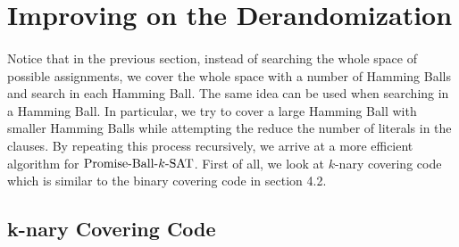 \documentclass[a4paper,12pts]{article}
\newcommand{\SAT}{\textnormal{$k$-SAT}}
\newcommand{\PBS}{\textnormal{Promise-Ball-$\SAT$}}
\begin{document}
\section{Improving on the Derandomization\cite{Moser11}}
\paragraph{} Notice that in the previous section, instead of searching the whole space of possible assignments, we cover the whole space with a number of Hamming Balls and search in each Hamming Ball. The same idea can be used when searching in a Hamming Ball. In particular, we try to cover a large Hamming Ball with smaller Hamming Balls while attempting the reduce the number of literals in the clauses. By repeating this process recursively, we arrive at a more efficient algorithm for $\PBS$. First of all, we look at $k$-nary covering code which is similar to the binary covering code in section 4.2.
\subsection{k-nary Covering Code}
\end{document}
